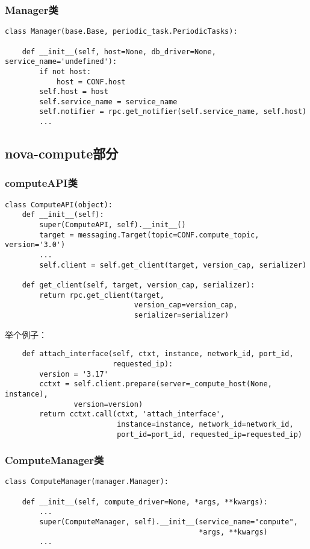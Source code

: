 \documentclass[a4paper,left=2.5cm,right=2.5cm,11pt]{article}
\begin{document}
\subsubsection{Manager类}
    \begin{lstlisting}
class Manager(base.Base, periodic_task.PeriodicTasks):

    def __init__(self, host=None, db_driver=None, service_name='undefined'):
        if not host:
            host = CONF.host
        self.host = host
        self.service_name = service_name
        self.notifier = rpc.get_notifier(self.service_name, self.host)
        ...
    \end{lstlisting}

\subsection{nova-compute部分}
\subsubsection{computeAPI类}
    \begin{lstlisting}
class ComputeAPI(object):
    def __init__(self):
        super(ComputeAPI, self).__init__()
        target = messaging.Target(topic=CONF.compute_topic, version='3.0')
        ...
        self.client = self.get_client(target, version_cap, serializer)

    def get_client(self, target, version_cap, serializer):
        return rpc.get_client(target,
                              version_cap=version_cap,
                              serializer=serializer)
    \end{lstlisting}

    举个例子：
    \begin{lstlisting}
    def attach_interface(self, ctxt, instance, network_id, port_id,
                         requested_ip):
        version = '3.17'
        cctxt = self.client.prepare(server=_compute_host(None, instance),
                version=version)
        return cctxt.call(ctxt, 'attach_interface',
                          instance=instance, network_id=network_id,
                          port_id=port_id, requested_ip=requested_ip)
    \end{lstlisting}

\subsubsection{ComputeManager类}
    \begin{lstlisting}
class ComputeManager(manager.Manager):
    
    def __init__(self, compute_driver=None, *args, **kwargs):
        ...
        super(ComputeManager, self).__init__(service_name="compute",
                                             *args, **kwargs)
        ...
    \end{lstlisting}
\end{document}
